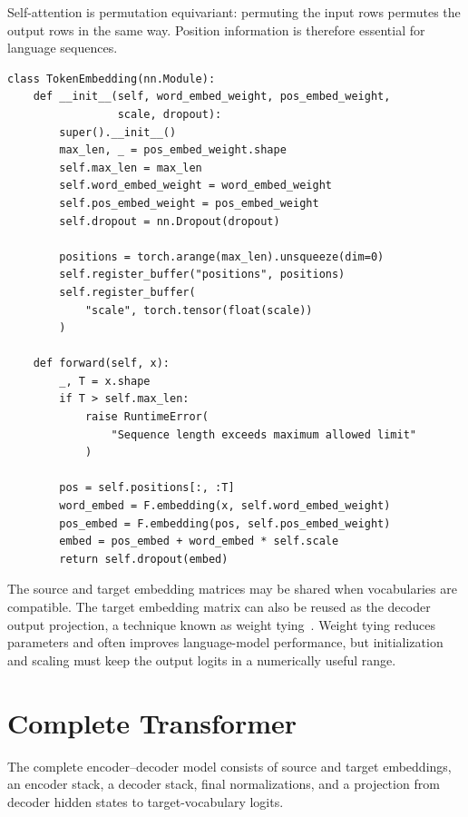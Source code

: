 \documentclass[11pt]{article}
\begin{document}
Self-attention is permutation equivariant: permuting the input rows permutes the output rows in the same way. Position information is therefore essential for language sequences.

\begin{lstlisting}[caption={Token-plus-position embedding layer.},label={lst:embedding}]
class TokenEmbedding(nn.Module):
    def __init__(self, word_embed_weight, pos_embed_weight,
                 scale, dropout):
        super().__init__()
        max_len, _ = pos_embed_weight.shape
        self.max_len = max_len
        self.word_embed_weight = word_embed_weight
        self.pos_embed_weight = pos_embed_weight
        self.dropout = nn.Dropout(dropout)

        positions = torch.arange(max_len).unsqueeze(dim=0)
        self.register_buffer("positions", positions)
        self.register_buffer(
            "scale", torch.tensor(float(scale))
        )

    def forward(self, x):
        _, T = x.shape
        if T > self.max_len:
            raise RuntimeError(
                "Sequence length exceeds maximum allowed limit"
            )

        pos = self.positions[:, :T]
        word_embed = F.embedding(x, self.word_embed_weight)
        pos_embed = F.embedding(pos, self.pos_embed_weight)
        embed = pos_embed + word_embed * self.scale
        return self.dropout(embed)
\end{lstlisting}

The source and target embedding matrices may be shared when vocabularies are compatible. The target embedding matrix can also be reused as the decoder output projection, a technique known as weight tying~\cite{press2017using}. Weight tying reduces parameters and often improves language-model performance, but initialization and scaling must keep the output logits in a numerically useful range.

\section{Complete Transformer}
\label{sec:transformer}

The complete encoder--decoder model consists of source and target embeddings, an encoder stack, a decoder stack, final normalizations, and a projection from decoder hidden states to target-vocabulary logits.
\end{document}
